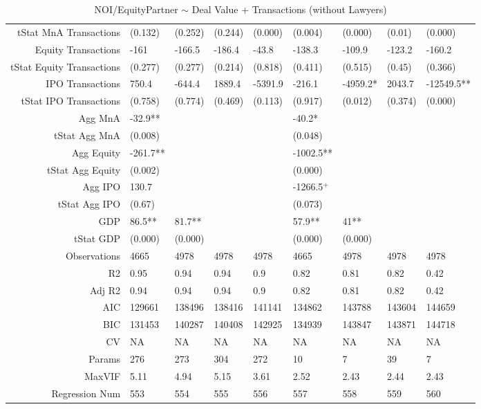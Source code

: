 \begin{table}[ht]
\begin{tabular}{rllllllll}
  tStat MnA Transactions & (0.132) & (0.252) & (0.244) & (0.000) & (0.004) & (0.000) & (0.01) & (0.000) \\ 
  Equity Transactions & -161 & -166.5 & -186.4 & -43.8 & -138.3 & -109.9 & -123.2 & -160.2 \\ 
  tStat Equity Transactions & (0.277) & (0.277) & (0.214) & (0.818) & (0.411) & (0.515) & (0.45) & (0.366) \\ 
  IPO Transactions & 750.4 & -644.4 & 1889.4 & -5391.9 & -216.1 & -4959.2* & 2043.7 & -12549.5** \\ 
  tStat IPO Transactions & (0.758) & (0.774) & (0.469) & (0.113) & (0.917) & (0.012) & (0.374) & (0.000) \\ 
  Agg MnA & -32.9** &  &  &  & -40.2* &  &  &  \\ 
  tStat Agg MnA & (0.008) &  &  &  & (0.048) &  &  &  \\ 
  Agg Equity & -261.7** &  &  &  & -1002.5** &  &  &  \\ 
  tStat Agg Equity & (0.002) &  &  &  & (0.000) &  &  &  \\ 
  Agg IPO & 130.7 &  &  &  & -1266.5$^{+}$ &  &  &  \\ 
  tStat Agg IPO & (0.67) &  &  &  & (0.073) &  &  &  \\ 
  GDP & 86.5** & 81.7** &  &  & 57.9** & 41** &  &  \\ 
  tStat GDP & (0.000) & (0.000) &  &  & (0.000) & (0.000) &  &  \\ 
  Observations & 4665 & 4978 & 4978 & 4978 & 4665 & 4978 & 4978 & 4978 \\ 
  R2 & 0.95 & 0.94 & 0.94 & 0.9 & 0.82 & 0.81 & 0.82 & 0.42 \\ 
  Adj R2 & 0.94 & 0.94 & 0.94 & 0.9 & 0.82 & 0.81 & 0.82 & 0.42 \\ 
  AIC & 129661 & 138496 & 138416 & 141141 & 134862 & 143788 & 143604 & 144659 \\ 
  BIC & 131453 & 140287 & 140408 & 142925 & 134939 & 143847 & 143871 & 144718 \\ 
  CV & NA & NA & NA & NA & NA & NA & NA & NA \\ 
  Params & 276 & 273 & 304 & 272 & 10 & 7 & 39 & 7 \\ 
  MaxVIF & 5.11 & 4.94 & 5.15 & 3.61 & 2.52 & 2.43 & 2.44 & 2.43 \\ 
  Regression Num & 553 & 554 & 555 & 556 & 557 & 558 & 559 & 560 \\ 
   \hline
\end{tabular}
\caption{NOI/EquityPartner $\sim$ Deal Value + Transactions (without Lawyers)} 
\end{table}
